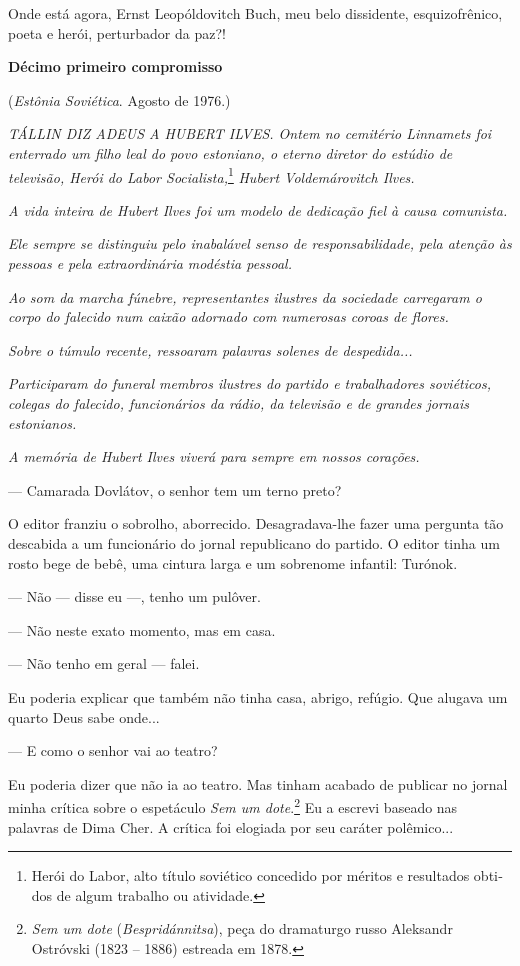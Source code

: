Onde está agora, Ernst Leopóldovitch Buch, meu belo dissidente,
esquizofrênico, poeta e herói, perturbador da paz?!

\textbf{Décimo primeiro compromisso}

(\emph{Estônia Soviética}. Agosto de 1976.)

\emph{TÁLLIN DIZ ADEUS A HUBERT ILVES. Ontem no cemitério Linnamets foi
enterrado um filho leal do povo estoniano, o eterno diretor do estúdio
de televisão, Herói do Labor Socialista,}\footnote{Herói do Labor, alto
  título soviético concedido por méritos e resultados obti­dos de algum
  trabalho ou atividade.} \emph{Hubert Voldemárovitch Ilves.}

\emph{A vida inteira de Hubert Ilves foi um modelo de dedicação fiel à
causa comunista.}

\emph{Ele sempre se distinguiu pelo inabalável senso de
responsabilidade, pela atenção às pessoas e pela extraordinária modéstia
pessoal.}

\emph{Ao som da marcha fúnebre, representantes ilustres da sociedade
carregaram o corpo do falecido num caixão adornado com numerosas coroas
de flores.}

\emph{Sobre o túmulo recente, ressoaram palavras solenes de
despedida...}

\emph{Participaram do funeral membros ilustres do partido e
trabalhadores soviéticos, colegas do falecido, funcionários da rádio, da
televisão e de grandes jornais estonianos.}

\emph{A memória de Hubert Ilves viverá para sempre em nossos corações.}

--- Camarada Dovlátov, o senhor tem um terno preto?

O editor franziu o sobrolho, aborrecido. Desagradava-lhe fazer uma
pergunta tão descabida a um funcionário do jornal republicano do
partido. O editor tinha um rosto bege de bebê, uma cintura larga e um
sobrenome infantil: Turónok.

--- Não --- disse eu ---, tenho um pulôver.

--- Não neste exato momento, mas em casa.

--- Não tenho em geral --- falei.

Eu poderia explicar que também não tinha casa, abrigo, refúgio. Que
alugava um quarto Deus sabe onde...

--- E como o senhor vai ao teatro?

Eu poderia dizer que não ia ao teatro. Mas tinham acabado de publicar no
jornal minha crítica sobre o espetáculo \emph{Sem um dote}.\footnote{\emph{Sem
  um dote} (\emph{Bespridánnitsa}), peça do dramaturgo russo Aleksandr
  Ostróvski (1823 -- 1886) estreada em 1878.} Eu a escrevi baseado nas
palavras de Dima Cher. A crítica foi elogiada por seu caráter
polêmico...

